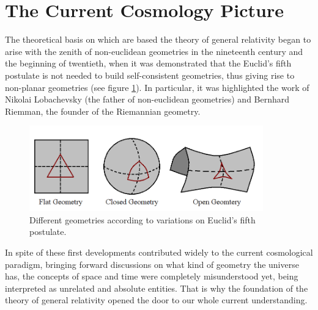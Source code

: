 



\section{The Current Cosmology Picture }
\label{sec:TheCurrentCosmologyPicture}


The theoretical basis on which are based the theory of general relativity
began to arise with the zenith of non-euclidean geometries in the 
nineteenth century and the beginning of twentieth, when it was demonstrated 
that the Euclid's fifth postulate is not needed to build self-consistent 
geometries, thus giving rise to non-planar geometries (see figure 
\ref{fig:NonEuclidean}). In particular, it was highlighted the work of 
Nikolai Lobachevsky (the father of non-euclidean geometries) and Bernhard 
Riemman, the founder of the Riemannian geometry.



\begin{figure}[htbp]
	\centering
	\includegraphics[width=0.9\textwidth]
	{./figures/1_introduction/Non_Euclidean.png}
	
	\caption{\small{Different geometries according to variations on	
	Euclid's fifth postulate.}}
	
	\label{fig:NonEuclidean}
\end{figure}


In spite of these first developments contributed widely to the current 
cosmological paradigm, bringing forward discussions on what kind of 
geometry the universe has, the concepts of space and time were completely 
misunderstood yet, being interpreted as unrelated and absolute entities.
That is why the foundation of the theory of general relativity opened the
door to our whole current understanding.


